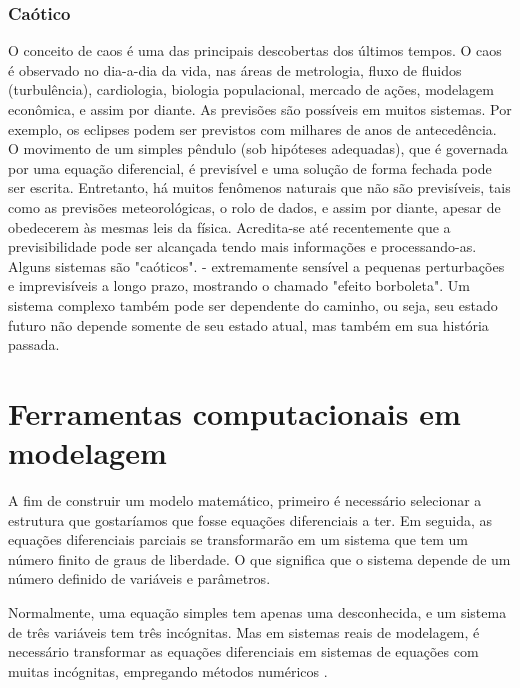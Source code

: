 \documentclass[11pt, letterpaper, portuguese]{article}
\begin{document}
    \subsubsection{Caótico}
    \par{O conceito de caos é uma das principais descobertas dos últimos tempos. O caos é observado no dia-a-dia da vida, nas áreas de metrologia, fluxo de fluidos (turbulência), cardiologia, biologia populacional, mercado de ações, modelagem econômica, e assim por diante. As previsões são possíveis em muitos sistemas. Por exemplo, os eclipses podem ser previstos com milhares de anos de antecedência. O movimento de um simples pêndulo (sob hipóteses adequadas), que é governada por uma equação diferencial, é previsível e uma solução de forma fechada pode ser escrita. Entretanto, há muitos fenômenos naturais que não são previsíveis, tais como as previsões meteorológicas, o rolo de dados, e assim por diante, apesar de obedecerem às mesmas leis da física. Acredita-se até recentemente que a previsibilidade pode ser alcançada tendo mais informações e processando-as. Alguns sistemas são "caóticos". - extremamente sensível a pequenas perturbações e imprevisíveis a longo prazo, mostrando o chamado "efeito borboleta". Um sistema complexo também pode ser dependente do caminho, ou seja, seu estado futuro não depende somente de seu estado atual, mas também em sua história passada. \cite{garfinkel_shevtsov_guo_2017}}
    
    
    
     
  
   
    
\newpage

\section{Ferramentas computacionais em modelagem}

\par{A fim de construir um modelo matemático, primeiro é necessário selecionar a estrutura que gostaríamos que fosse equações diferenciais a ter. Em seguida, as equações diferenciais parciais se transformarão em um sistema que  tem um número finito de graus de liberdade. O que significa que o sistema depende de um número definido  de variáveis e parâmetros.}


\par{Normalmente, uma equação simples tem apenas uma desconhecida, e um sistema de três variáveis tem três incógnitas. Mas em sistemas reais de modelagem, é necessário transformar as equações diferenciais em sistemas de equações com muitas incógnitas, empregando métodos numéricos  \cite{garfinkel_shevtsov_guo_2017}.}
\end{document}
